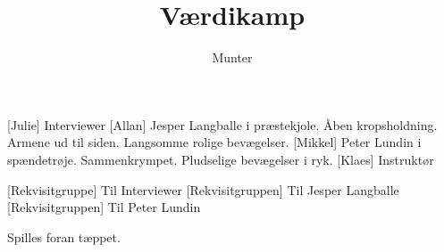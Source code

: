 \documentclass[a4paper,11pt]{article}
\title{Værdikamp}
\author{Munter}
\begin{document}
\maketitle

\begin{roles}
	[Julie] Interviewer
	[Allan] Jesper Langballe i præstekjole. Åben kropsholdning. Armene ud til siden. Langsomme rolige bevægelser.
	[Mikkel] Peter Lundin i spændetrøje. Sammenkrympet. Pludselige bevægelser i ryk.
	[Klaes] Instruktør
\end{roles}

\begin{props}
	[Rekvisitgruppe] Til Interviewer
	[Rekvisitgruppen] Til Jesper Langballe
	[Rekvisitgruppen] Til Peter Lundin
\end{props}


\scene Spilles foran tæppet.
  
\end{document}
